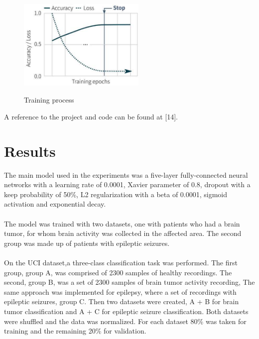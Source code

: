 \documentclass{llncs}       %
\begin{document}
\paragraph{}

\begin{figure}[h]
\centering
\includegraphics[width=6.08cm,height=5.11cm]{media/training-pro.eps}
\caption{ Training process}
\end{figure}

 A reference to the project and code can be found at [14]. 
\paragraph{}\paragraph{}

\paragraph{}
\section{Results}
\label{sec:4}
 The main model used in the experiments was a five-layer fully-connected neural networks with a learning rate of 0.0001, Xavier parameter of 0.8, dropout with a keep probability of 50\%, L2 regularization with a beta of 0.0001, sigmoid activation and exponential decay. 

\paragraph{}
The model was trained with two datasets, one with patients who had a brain tumor, for whom brain activity was collected in the affected area. The second group was made up of  patients with epileptic seizures.
\paragraph{}
On the UCI dataset,a three-class classification task was performed. The first group, group A, was comprised of  2300 samples of healthy recordings. The second, group B, was a set of 2300 samples of brain tumor activity recording, The same approach was implemented for epilepsy,  where a set of recordings with epileptic seizures, group  C. Then two datasets were created, A + B for brain tumor classification and A + C for epileptic seizure classification. Both datasets were shuffled and the data was normalized. For each dataset 80\% was taken for training and the remaining 20\% for validation. 
\end{document}
